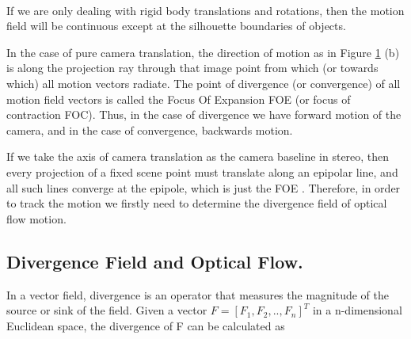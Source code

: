 \documentclass[12pt,fleqn]{book} %
\begin{document}
\begin{figure}[h]
\begin{dBox}
\centering
  \mbox{
   }
   \caption{\label{fig:dynamic12} }   
\end{dBox}   
\end{figure}

If we are only dealing with rigid body translations and rotations, then the motion field will be continuous except at the silhouette boundaries of objects.\bigskip

In the case of pure camera translation, the direction of motion as in Figure \ref{fig:dynamic12} (b) is along the projection ray through that image point from which (or towards which) all motion vectors radiate. The point of divergence (or convergence) of all motion field vectors is called the Focus Of Expansion FOE (or focus of contraction FOC). Thus, in the case of divergence we have forward motion of the camera, and in the case of convergence, backwards motion.\bigskip

If we take the axis of camera translation as the camera baseline in stereo, then every projection of a fixed scene point must translate along an epipolar line, and all such lines converge at the epipole, which is just the FOE \cite{dynamic2}.  Therefore, in order to track the motion we firstly need to determine the divergence field of optical flow motion.\bigskip


\subsection{Divergence Field and Optical Flow.}
In a vector field, divergence is an operator that measures the magnitude of the source or sink of the field. Given a vector $F=[F_1,F_2,..,F_n]^T$ in a n-dimensional Euclidean space, the divergence of F can be calculated as \bigskip
\end{document}
